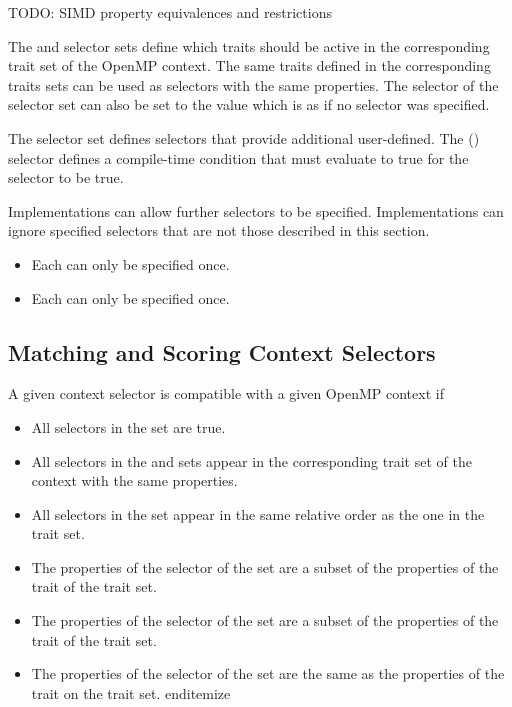 \begin{itemize}
TODO: SIMD property equivalences and restrictions

The  and  selector sets define which traits should be active in the corresponding trait set of the OpenMP context. The same traits defined in the corresponding traits sets can be used as selectors with the same properties. The  selector of the  selector set can also be set to the value  which is as if no  selector was specified. 

The  selector set defines selectors that provide additional user-defined. The () selector defines a compile-time condition that must  evaluate to true for the selector to be true. 

Implementations can allow further selectors to be specified. Implementations can ignore specified selectors that are not those described in this section.

\restrictions
\begin{itemize}
 \item Each  can only be specified once.
 \item Each  can only be specified once.
\end{itemize}

\subsection{Matching and Scoring Context Selectors}
\label{subsec:Matching and Scoring Context Selectors}

A given context selector is compatible with a given OpenMP context if
\begin{itemize}
 \item All selectors in the  set are true.
 \item All selectors in the  and  sets appear in the corresponding trait set of the context with the same properties.
 \item All selectors in the  set appear in the same relative order as the one in the  trait set.
 \item The properties of the  selector of the  set are a subset of the properties of the  trait of the  trait set.
 \item The properties of the  selector of the  set are a subset of the properties of the  trait of the  trait set.
 \item The properties of the  selector of the  set are the same as the properties of the  trait on the  trait set.
 end{itemize}


\end{itemize}
\end{itemize}
